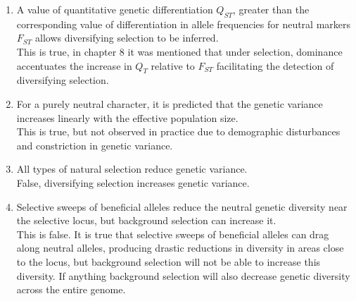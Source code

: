 \documentclass[12pt]{amsart}
\begin{document}
\begin{enumerate}
\item A value of quantitative genetic differentiation $Q_{ST}$, greater than the corresponding value of differentiation in allele frequencies for neutral markers $F_{ST}$ allows diversifying selection to be inferred.\\
This is true, in chapter 8 it was mentioned that under selection, dominance accentuates the increase in $Q_T$ relative to $F_{ST}$ facilitating the detection of diversifying selection.\\
\item For a purely neutral character, it is predicted that the genetic variance increases linearly with the effective population size.\\
This is true, but not observed in practice due to demographic disturbances and constriction in genetic variance. \\
\item All types of natural selection reduce genetic variance.\\
False, diversifying selection increases genetic variance.\\
\item Selective sweeps of beneficial alleles reduce the neutral genetic diversity near the selective locus, but background selection can increase it.\\
This is false. It is true that selective sweeps of beneficial alleles can drag along neutral alleles, producing drastic reductions in diversity in areas close to the locus, but background selection will not be able to increase this diversity. If anything background selection will also decrease genetic diversity across the entire genome.\\
\medskip
\end{enumerate}
\end{document}
